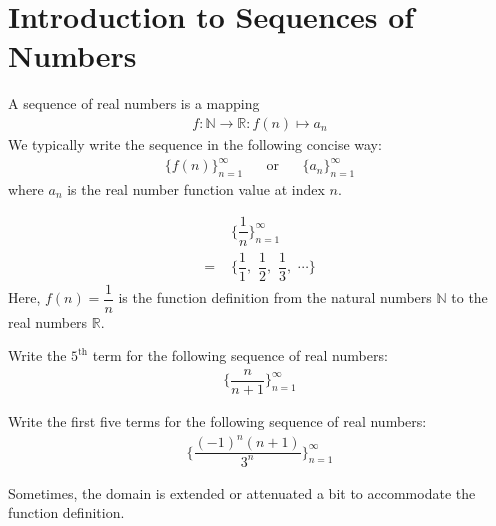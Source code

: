 \section{Introduction to Sequences of Numbers}\label{introduction_to_sequences_of_numbers}

\begin{definition}
A sequence of real numbers is a mapping
\begin{align*}
    f: \mathbb{N} \longrightarrow \mathbb{R}: f(n) \mapsto a_{n}
\end{align*}
We typically write the sequence in the following concise way:
\begin{align*}
    \{f(n)\}_{n=1}^{\infty} \hspace{20pt} \text{or} \hspace{20pt} \{a_{n}\}_{n=1}^{\infty}
\end{align*}
where $a_{n}$ is the real number function value at index $n$.
\end{definition}

\begin{example}
\begin{align*}
    &\Big\{\dfrac{1}{n}\Big\}_{n=1}^{\infty}\\[2ex]
    = \hspace{4pt} &\Big\{\dfrac{1}{1}, \hspace{4pt} \dfrac{1}{2}, \hspace{4pt} \dfrac{1}{3}, \hspace{4pt} \cdots \Big\}
\end{align*}
Here, $f(n) = \dfrac{1}{n}$ is the function definition from the natural numbers $\mathbb{N}$ to the real numbers $\mathbb{R}$.
\end{example}

\begin{exercise}
Write the $5^{\text{th}}$ term for the following sequence of real numbers:
\begin{align*}
    \Big\{\dfrac{n}{n+1}\Big\}_{n=1}^{\infty}
\end{align*}
\end{exercise}

\begin{exercise}
Write the first five terms for the following sequence of real numbers:
\begin{align*}
    \Big\{\dfrac{(-1)^{n}(n+1)}{3^{n}}\Big\}_{n=1}^{\infty}
\end{align*}
\end{exercise}

Sometimes, the domain is extended or attenuated a bit to accommodate the function definition.


